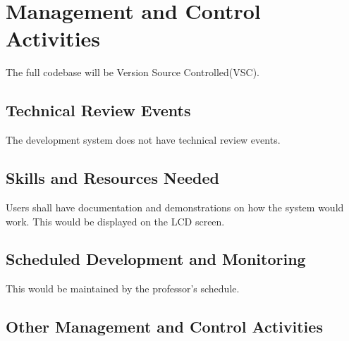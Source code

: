 
\chapter{Management and Control Activities}
\label{loc:MngtContrlActivities}
% 

The full codebase will be Version Source Controlled(VSC).

\section{Technical Review Events}
\label{loc:MCA_TechReviewEvents}
% 

The development system does not have technical review events.


\section{Skills and Resources Needed}
\label{loc:MCA_SkillsResourcesNeeded}
% 

Users shall have documentation and demonstrations on how the system would work. This would be displayed on the LCD screen.

\section{Scheduled Development and Monitoring}
\label{loc:MCA_ScheduleDevMonitoring}
% 

This would be maintained by the professor's schedule.


\section{Other Management and Control Activities}
\label{loc:MCA_OtherActivities}
% 

